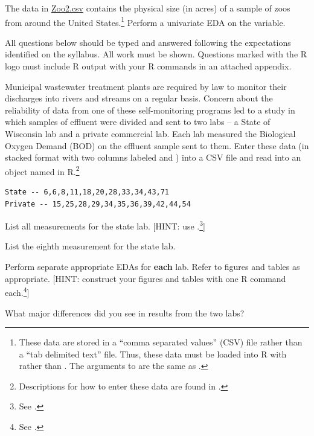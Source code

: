 \documentclass[10pt,openany]{book}\usepackage[]{graphicx}\usepackage[]{color}
\begin{document}
\begin{exsection}
  \item \label{revex:quEDAZoo2} \rhw{} The data in \href{}{Zoo2.csv} contains the physical size (in acres) of a sample of zoos from around the United States.\footnote{These data are stored in a ``comma separated values'' (CSV) file rather than a ``tab delimited text'' file.  Thus, these data must be loaded into R with  rather than .  The arguments to  are the same as .}  Perform a univariate EDA on the  variable. 
\end{exsection}

\newpage
\begin{hwsection}{All questions below should be typed and answered following the expectations identified on the syllabus.  All work must be shown.  Questions marked with the R logo must include R output with your R commands in an attached appendix.}

  \item \label{hwprob:quEDABOD} \rhw{} Municipal wastewater treatment plants are required by law to monitor their discharges into rivers and streams on a regular basis.  Concern about the reliability of data from one of these self-monitoring programs led to a study in which samples of effluent were divided and sent to two labs -- a State of Wisconsin lab and a private commercial lab.  Each lab measured the Biological Oxygen Demand (BOD) on the effluent sample sent to them.  Enter these data (in stacked format with two columns labeled  and ) into a CSV file and read into an object named  in R.\footnote{Descriptions for how to enter these data are found in .}
    \begin{Verbatim}[xleftmargin=5mm]
State -- 6,6,8,11,18,20,28,33,34,43,71
Private -- 15,25,28,29,34,35,36,39,42,44,54
    \end{Verbatim}
  \begin{Enumerate}
    \item List all measurements for the state lab.  [HINT: use .\footnote{See .}]
    \item List the eighth measurement for the state lab.
    \item Perform separate appropriate EDAs for \textbf{each} lab.  Refer to figures and tables as appropriate.  [HINT: construct your figures and tables with one R command each.\footnote{See .}]
    \item What major differences did you see in results from the two labs?
  \end{Enumerate}


\end{hwsection}
\end{document}
